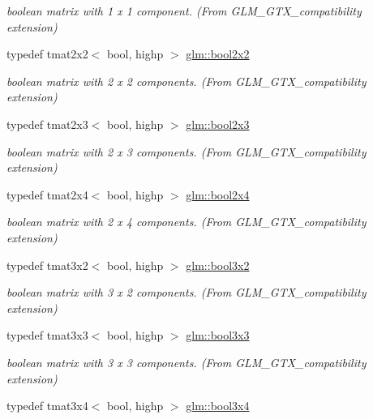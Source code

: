 \begin{DoxyCompactItemize}
\begin{DoxyCompactList}\small\item\em boolean matrix with 1 x 1 component. (From G\+L\+M\+\_\+\+G\+T\+X\+\_\+compatibility extension) \end{DoxyCompactList}\item 
typedef tmat2x2$<$ bool, highp $>$ \hyperlink{group__gtx__compatibility_gaeb49db4b236907ba11f5b9117274b5d8}{glm\+::bool2x2}
\begin{DoxyCompactList}\small\item\em boolean matrix with 2 x 2 components. (From G\+L\+M\+\_\+\+G\+T\+X\+\_\+compatibility extension) \end{DoxyCompactList}\item 
typedef tmat2x3$<$ bool, highp $>$ \hyperlink{group__gtx__compatibility_ga2d7e2c79179868a41d1f9f7a63f2ae52}{glm\+::bool2x3}
\begin{DoxyCompactList}\small\item\em boolean matrix with 2 x 3 components. (From G\+L\+M\+\_\+\+G\+T\+X\+\_\+compatibility extension) \end{DoxyCompactList}\item 
typedef tmat2x4$<$ bool, highp $>$ \hyperlink{group__gtx__compatibility_gacbd1c62dfad23155dba803d7c5125288}{glm\+::bool2x4}
\begin{DoxyCompactList}\small\item\em boolean matrix with 2 x 4 components. (From G\+L\+M\+\_\+\+G\+T\+X\+\_\+compatibility extension) \end{DoxyCompactList}\item 
typedef tmat3x2$<$ bool, highp $>$ \hyperlink{group__gtx__compatibility_ga6a944ad10139c8915bf72a832273ff02}{glm\+::bool3x2}
\begin{DoxyCompactList}\small\item\em boolean matrix with 3 x 2 components. (From G\+L\+M\+\_\+\+G\+T\+X\+\_\+compatibility extension) \end{DoxyCompactList}\item 
typedef tmat3x3$<$ bool, highp $>$ \hyperlink{group__gtx__compatibility_ga5c0ded80422867674cd651ab2261f2a3}{glm\+::bool3x3}
\begin{DoxyCompactList}\small\item\em boolean matrix with 3 x 3 components. (From G\+L\+M\+\_\+\+G\+T\+X\+\_\+compatibility extension) \end{DoxyCompactList}\item 
typedef tmat3x4$<$ bool, highp $>$ \hyperlink{group__gtx__compatibility_gaf3777caf1e50112919be2939be05ae7e}{glm\+::bool3x4}

\end{DoxyCompactItemize}
